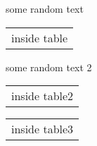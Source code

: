 \documentclass{article}
\begin{document}
some random text
\begin{tabular}{c}
    inside table
\end{tabular}
some random text 2
\begin{tabular}{c}
    inside table2
\end{tabular}

\begin{tabular}{c}
    inside table3
\end{tabular}
\end{document}
